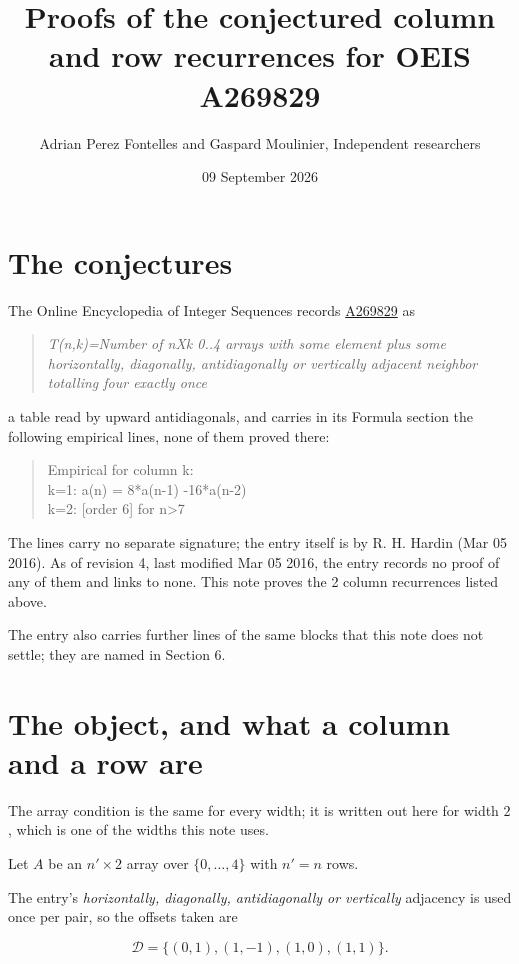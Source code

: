 \documentclass[11pt]{article}
\title{Proofs of the conjectured column and row recurrences for OEIS A269829}
\author{Adrian Perez Fontelles and Gaspard Moulinier, Independent researchers}
\date{09 September 2026}
\theoremstyle{definition}
\begin{document}
\maketitle
\section{The conjectures}

The Online Encyclopedia of Integer Sequences records \href{https://oeis.org/A269829}{A269829} as

\begin{quote}\itshape T(n,k)=Number of nXk 0..4 arrays with some element plus some horizontally, diagonally, antidiagonally or vertically adjacent neighbor totalling four exactly once\end{quote}

a table read by upward antidiagonals, and carries in its Formula section the following empirical lines, none of them proved there:

\begin{quote}\ttfamily Empirical for column k:\\
k=1: a(n) = 8*a(n-1) -16*a(n-2)\\k=2: [order 6] for n>7\end{quote}

The lines carry no separate signature; the entry itself is by R. H. Hardin (Mar 05 2016). As of revision 4, last modified Mar 05 2016, the entry records no proof of any of them and links to none. This note proves the 2 column recurrences listed above.

The entry also carries further lines of the same blocks that this note does not settle; they are named in Section 6.

\section{The object, and what a column and a row are}

The array condition is the same for every width; it is written out here for width $2$, which is one of the widths this note uses.

Let $A$ be an $n' \times 2$ array over $\{0,\dots,4\}$ with $n' = n$ rows.

The entry's {\itshape horizontally, diagonally, antidiagonally or vertically} adjacency is used once per pair, so the offsets taken are

\[\mathcal{D} = \{(0,1), (1,-1), (1,0), (1,1)\}.\]
\end{document}

